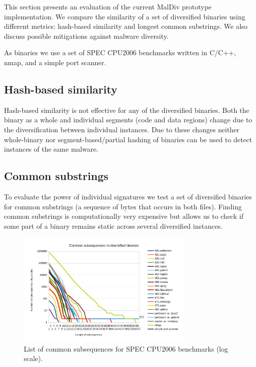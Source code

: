 \documentclass[10pt, preprint]{sigplanconf}
\begin{document}
This section presents an evaluation of the current MalDiv prototype
implementation. We compare the similarity of a set of diversified binaries
using different metrics: hash-based similarity and longest common substrings.
We also discuss possible mitigations against malware diversity.

As binaries we use a set of SPEC CPU2006 benchmarks written in C/C++,
nmap, and a simple port scanner.


\subsection{Hash-based similarity}

Hash-based similarity is not effective for any of the diversified binaries.
Both the binary as a whole and individual segments (code and data regions)
change due to the diversification between individual instances. Due to these
changes neither whole-binary nor segment-based/partial hashing of binaries can
be used to detect instances of the same malware.


\subsection{Common substrings}

To evaluate the power of individual signatures we test a set of diversified
binaries for common substrings (a sequence of bytes that occurs in both files).
Finding common substrings is computationally very expensive but allows us to
check if some part of a binary remains static across several diversified
instances.

\begin{figure}[ht!]
 \begin{center}
   \includegraphics[width=85mm]{figures/subsequences-spec}
   \caption{List of common subsequences for SPEC CPU2006 benchmarks (log
     scale).}
   \label{fig:subsequencesspec}
 \end{center}
\end{figure}
\end{document}
